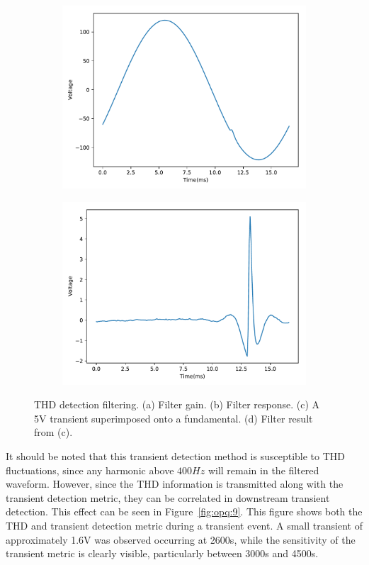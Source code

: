 \begin{figure}[h]
	\begin{subfigure}{.5\textwidth}
		\centering
		\includegraphics[width=0.86\linewidth]{images/opq-box/box_eval/5v_transient.pdf}
		\caption{}
		\label{fig:opq:8:3}
	\end{subfigure}%
	\begin{subfigure}{.5\textwidth}
		\centering
		\includegraphics[width=0.86\linewidth]{images/opq-box/box_eval/5v_transient_filtered.pdf}
		\caption{}
		\label{fig:opq:8:4}
	\end{subfigure}
	\caption{THD detection filtering. (a) Filter gain. (b) Filter response. (c) A 5V transient superimposed onto a fundamental. (d) Filter result from (c).}
	\label{fig:opq:8}
\end{figure}

It should be noted that this transient detection method is susceptible to THD fluctuations, since any harmonic above $400Hz$ will remain in the filtered waveform.
However, since the THD information is transmitted along with the transient detection metric, they can be correlated in downstream transient detection.
This effect can be seen in Figure~\ref{fig:opq:9}.
This figure shows both the THD and transient detection metric during a transient event.
A small transient of approximately 1.6V was observed occurring at 2600s, while the sensitivity of the transient metric is clearly visible, particularly between 3000s and 4500s.

